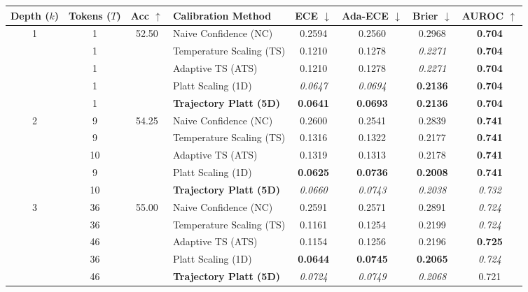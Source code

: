 \begin{table}[t]
\setlength{\tabcolsep}{4pt}
\renewcommand{\arraystretch}{1.05}
\centering
\footnotesize
\begin{tabular}{ccclcccc}
\toprule
\textbf{Depth ($k$)} & \textbf{Tokens ($T$)} & \textbf{Acc} $\uparrow$ & \textbf{Calibration Method} & \textbf{ECE} $\downarrow$ & \textbf{Ada-ECE} $\downarrow$ & \textbf{Brier} $\downarrow$ & \textbf{AUROC} $\uparrow$ \\
\midrule
\multirow{5}{*}{1} & 1 & \multirow{5}{*}{52.50} & Naive Confidence (NC) & 0.2594 & 0.2560 & 0.2968 & \textbf{0.704} \\
 & 1 &  & Temperature Scaling (TS) & 0.1210 & 0.1278 & \textit{0.2271} & \textbf{0.704} \\
 & 1 &  & Adaptive TS (ATS) & 0.1210 & 0.1278 & \textit{0.2271} & \textbf{0.704} \\
 & 1 &  & Platt Scaling (1D) & \textit{0.0647} & \textit{0.0694} & \textbf{0.2136} & \textbf{0.704} \\
 & 1 &  & \textbf{Trajectory Platt (5D)} & \textbf{0.0641} & \textbf{0.0693} & \textbf{0.2136} & \textbf{0.704} \\
\midrule
\multirow{5}{*}{2} & 9 & \multirow{5}{*}{54.25} & Naive Confidence (NC) & 0.2600 & 0.2541 & 0.2839 & \textbf{0.741} \\
 & 9 &  & Temperature Scaling (TS) & 0.1316 & 0.1322 & 0.2177 & \textbf{0.741} \\
 & 10 &  & Adaptive TS (ATS) & 0.1319 & 0.1313 & 0.2178 & \textbf{0.741} \\
 & 9 &  & Platt Scaling (1D) & \textbf{0.0625} & \textbf{0.0736} & \textbf{0.2008} & \textbf{0.741} \\
 & 10 &  & \textbf{Trajectory Platt (5D)} & \textit{0.0660} & \textit{0.0743} & \textit{0.2038} & \textit{0.732} \\
\midrule
\multirow{5}{*}{3} & 36 & \multirow{5}{*}{55.00} & Naive Confidence (NC) & 0.2591 & 0.2571 & 0.2891 & \textit{0.724} \\
 & 36 &  & Temperature Scaling (TS) & 0.1161 & 0.1254 & 0.2199 & \textit{0.724} \\
 & 46 &  & Adaptive TS (ATS) & 0.1154 & 0.1256 & 0.2196 & \textbf{0.725} \\
 & 36 &  & Platt Scaling (1D) & \textbf{0.0644} & \textbf{0.0745} & \textbf{0.2065} & \textit{0.724} \\
 & 46 &  & \textbf{Trajectory Platt (5D)} & \textit{0.0724} & \textit{0.0749} & \textit{0.2068} & 0.721 \\

\end{tabular}
\end{table}
